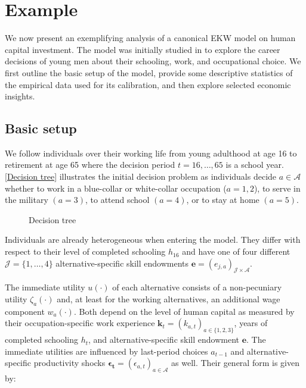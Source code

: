 \section{Example}\label{Example}
We now present an exemplifying analysis of a canonical EKW model on human capital investment. The model was initially studied in \citet{Keane.1997} to explore the career decisions of young men about their schooling, work, and occupational choice. We first outline the basic setup of the model, provide some descriptive statistics of the empirical data used for its calibration, and then explore selected economic insights.
\subsection{Basic setup}
We follow individuals over their working life from young adulthood at age 16 to retirement at age 65 where the decision period $t = 16, \dots, 65$  is a school year. \autoref{Decision tree} %
illustrates the initial decision problem as individuals decide $a\in\mathcal{A}$ whether to work in a blue-collar or white-collar occupation ($a = 1, 2$), to serve in the military $(a = 3)$, to attend school $(a = 4)$, or to stay at home $(a = 5)$.

%
\begin{figure}[t!]\centering
	\scalebox{0.75}{%
	}
	\caption{Decision tree}
	\label{Decision tree}
\end{figure}%
%

Individuals are already heterogeneous when entering the model. They differ with respect to their level of completed schooling $h_{16}$ and have one of four different $\mathcal{J} = \{1, \hdots, 4\}$ alternative-specific skill endowments $\bm{e} = \left(e_{j,a}\right)_{\mathcal{J} \times \mathcal{A}}$.

The immediate utility $u(\cdot)$ of each alternative consists of a non-pecuniary utility $\zeta_a(\cdot)$ and, at least for the working alternatives, an additional wage component $w_a(\cdot)$. Both depend on the level of human capital as measured by their occupation-specific work experience $\bm{k}_t = \left(k_{a,t}\right)_{a\in\{1, 2, 3\}}$, years of completed schooling $h_t$, and alternative-specific skill endowment $\bm{e}$. The immediate utilities are influenced by last-period choices $a_{t -1}$ and alternative-specific productivity shocks $\bm{\epsilon_t} = \left(\epsilon_{a,t}\right)_{a\in\mathcal{A}}$ as well. Their general form is given by:


